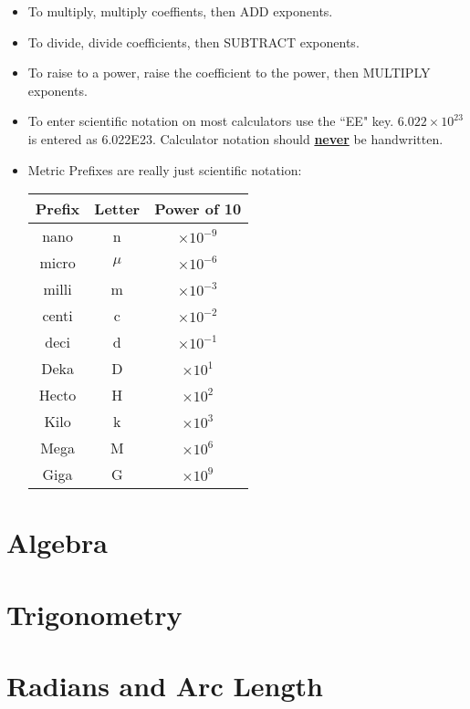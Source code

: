 \begin{itemize}
		\item To multiply, multiply coeffients, then ADD exponents.
		\item To divide, divide coefficients, then SUBTRACT exponents.
		\item To raise to a power, raise the coefficient to the power, then MULTIPLY exponents.
		\item To enter scientific notation on most calculators use the ``EE" key. $6.022 \times 10^{23}$ is entered as 6.022\scriptsize E\normalsize23.  Calculator notation should \underline{\textbf{never}} be handwritten. 
		\item Metric Prefixes are really just scientific notation:
		\begin{center}
			\begin{tabular}{|c|c|c|}
				\hline
				Prefix & Letter & Power of 10 \\
				\hline
				nano & n &  $ \times 10^{-9}$ \\
				\hline
				micro & $\mu$ &  $ \times 10^{-6}$ \\
				\hline
				milli & m & $ \times 10^{-3}$ \\
				\hline
				centi & c & $ \times 10^{-2}$ \\
				\hline
				deci & d & $ \times 10^{-1}$ \\
				\hline
				Deka & D & $ \times 10^{1}$ \\
				\hline
				Hecto & H & $ \times 10^{2}$ \\
				\hline
				Kilo & k & $ \times 10^{3}$ \\
				\hline
				Mega & M & $ \times 10^{6}$ \\
				\hline
				Giga & G & $ \times 10^{9}$ \\
				\hline
				
			\end{tabular}	
		\end{center}
		
		
	\end{itemize}

\section{Algebra}
\section{Trigonometry}

\newpage
\section {Radians and Arc Length}
